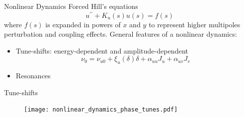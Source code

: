 \documentclass[aspectratio=169]{beamer}
\begin{document}
\begin{frame}{Nonlinear Dynamics}
    Forced Hill's equations
    \begin{equation*}
        u^{\prime\prime}+K_u(s)u(s) = f(s)
    \end{equation*}
    where $f(s)$ is expanded in powers of $x$ and $y$ to represent higher multipoles perturbation and coupling effects.
    \vfill
    General features of a nonlinear dynamics:
    \begin{itemize}
        \item Tune-shifts: energy-dependent and amplitude-dependent $$\nu_0 = \nu_{u0} + \xi_u(\delta) \delta + \alpha_{uu} J_u + \alpha_{uv} J_v$$
        \item Resonances
    \end{itemize}
\end{frame}
\begin{frame}{Tune-shifts}
    \begin{figure}
        \centering
        \texttt{[image: nonlinear\_dynamics\_phase\_tunes.pdf]}
    \end{figure}
\end{frame}
\end{document}
